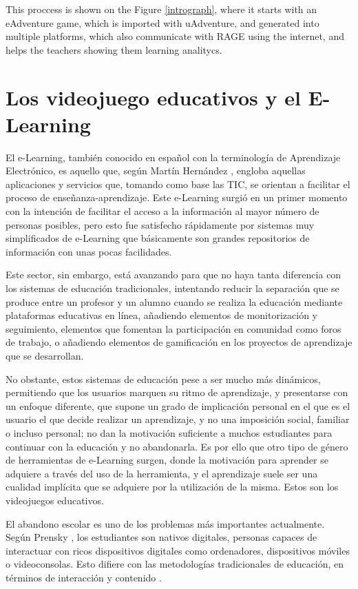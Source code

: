 This proccess is shown on the Figure \ref{intrograph}, where it starts with an eAdventure game, which is imported with uAdventure, and generated into multiple platforms, which also communicate with RAGE using the internet, and helps the teachers showing them learning analitycs.

\chapter{Los videojuego educativos y el E-Learning}
\label{seriousgames}

El e-Learning, también conocido en español con la terminología de Aprendizaje Electrónico, es aquello que, según Martín Hernández \cite{BaeloAlvarez2009}, engloba aquellas aplicaciones y servicios que, tomando como base las TIC, se orientan a facilitar el proceso de enseñanza-aprendizaje. Este e-Learning surgió en un primer momento con la intención de facilitar el acceso a la información al mayor número de personas posibles, pero esto fue satisfecho rápidamente por sistemas muy simplificados de e-Learning que básicamente son grandes repositorios de información con unas pocas facilidades.

Este sector, sin embargo, está avanzando para que no haya tanta diferencia con los sistemas de educación tradicionales, intentando reducir la separación que se produce entre un profesor y un alumno cuando se realiza la educación mediante plataformas educativas en línea, añadiendo elementos de monitorización y seguimiento, elementos que fomentan la participación en comunidad como foros de trabajo, o añadiendo elementos de gamificación en los proyectos de aprendizaje que se desarrollan.

No obstante, estos sistemas de educación pese a ser mucho más dinámicos, permitiendo que los usuarios marquen su ritmo de aprendizaje, y presentarse con un enfoque diferente, que supone un grado de implicación personal en el que es el usuario el que decide realizar un aprendizaje, y no una imposición social, familiar o incluso personal; no dan la motivación suficiente a muchos estudiantes para continuar con la educación y no abandonarla. Es por ello que otro tipo de género de herramientas de e-Learning surgen, donde la motivación para aprender se adquiere a través del uso de la herramienta, y el aprendizaje suele ser una cualidad implícita que se adquiere por la utilización de la misma. Estos son los videojuegos educativos.

El abandono escolar es uno de los problemas más importantes actualmente. Según Prensky \cite{Torrente2010}, los estudiantes son nativos digitales, personas capaces de interactuar con ricos dispositivos digitales como ordenadores, dispositivos móviles o videoconsolas. Esto difiere con las metodologías tradicionales de educación, en términos de interacción y contenido \cite{Torrente2010}.

